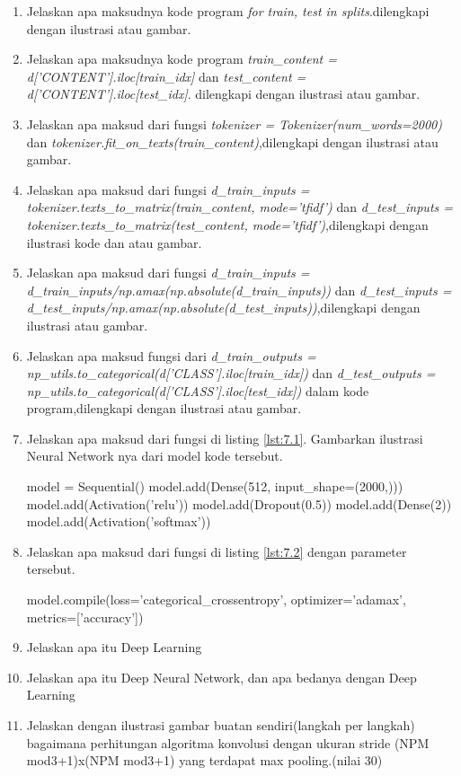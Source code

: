 \begin{enumerate}
\item
Jelaskan apa maksudnya kode program \emph{for train, test in splits}.dilengkapi dengan ilustrasi atau gambar.
\item
Jelaskan apa maksudnya kode program \emph{train\_content = d['CONTENT'].iloc[train\_idx]} dan \emph{test\_content = d['CONTENT'].iloc[test\_idx]}. dilengkapi dengan ilustrasi atau gambar.
\item
Jelaskan apa maksud dari fungsi \emph{tokenizer = Tokenizer(num\_words=2000)} dan \emph{tokenizer.fit\_on\_texts(train\_content)},dilengkapi dengan ilustrasi atau gambar.
\item
Jelaskan apa maksud dari fungsi \emph{d\_train\_inputs = tokenizer.texts\_to\_matrix(train\_content, mode='tfidf')} dan \emph{d\_test\_inputs = tokenizer.texts\_to\_matrix(test\_content, mode='tfidf')},dilengkapi dengan ilustrasi kode dan atau gambar.
\item
Jelaskan apa maksud dari fungsi \emph{d\_train\_inputs = d\_train\_inputs/np.amax(np.absolute(d\_train_inputs))} dan \emph{d\_test\_inputs = d\_test_inputs/np.amax(np.absolute(d\_test\_inputs))},dilengkapi dengan ilustrasi atau gambar.
\item
Jelaskan apa maksud fungsi dari \emph{d\_train\_outputs = np\_utils.to\_categorical(d['CLASS'].iloc[train\_idx])} dan \emph{d\_test\_outputs = np\_utils.to\_categorical(d['CLASS'].iloc[test\_idx])} dalam kode program,dilengkapi dengan ilustrasi atau gambar.
\item
Jelaskan apa maksud dari fungsi di listing \ref{lst:7.1}. Gambarkan ilustrasi Neural Network nya dari model kode tersebut.
\begin{listing}[caption=Membuat model Neural Network,label={lst:7.1}]
       model = Sequential()
       model.add(Dense(512, input_shape=(2000,)))
       model.add(Activation('relu'))
       model.add(Dropout(0.5))
       model.add(Dense(2))
       model.add(Activation('softmax'))
\end{listing}
\item
Jelaskan apa maksud dari fungsi di listing \ref{lst:7.2} dengan parameter tersebut.
\begin{listing}[caption=Compile model,label={lst:7.2}]
	model.compile(loss='categorical_crossentropy', optimizer='adamax',
	                  metrics=['accuracy'])
\end{listing}

\item
Jelaskan apa itu Deep Learning
\item
Jelaskan apa itu Deep Neural Network, dan apa bedanya dengan Deep Learning
\item
Jelaskan dengan ilustrasi gambar buatan sendiri(langkah per langkah) bagaimana perhitungan algoritma konvolusi dengan ukuran stride (NPM mod3+1)x(NPM mod3+1) yang terdapat max pooling.(nilai 30)

\end{enumerate}



